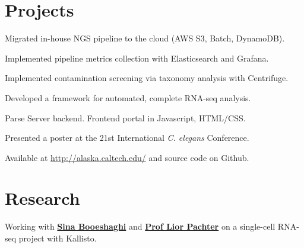 \documentclass[]{resume}
\begin{document}
\begin{minipage}[t]{0.66\textwidth}


\section{Projects}
\vspace{\topsep} %
\begin{tightemize}
\item Migrated in-house NGS pipeline to the cloud (AWS S3, Batch, DynamoDB).
\item Implemented pipeline metrics collection with Elasticsearch and Grafana.
\item Implemented contamination screening via taxonomy analysis with Centrifuge.
\end{tightemize}
\sectionsep

\begin{tightemize}
\item Developed a framework for automated, complete RNA-seq analysis.
\item Parse Server backend. Frontend portal in Javascript, HTML/CSS.
\item Presented a poster at the 21st International \textit{C. elegans} Conference.
\item Available at \textcolor{blue}{ \href{http://alaska.caltech.edu/}{http://alaska.caltech.edu/}} and source code on Github.
\end{tightemize}
\sectionsep


\section{Research}
Working with \textbf{\href{https://github.com/sbooeshaghi}{Sina Booeshaghi}} and \textbf{\href{https://liorpachter.wordpress.com/}{Prof Lior Pachter}} on a single-cell RNA-seq project with Kallisto.
\sectionsep


\end{minipage}
\end{document}

